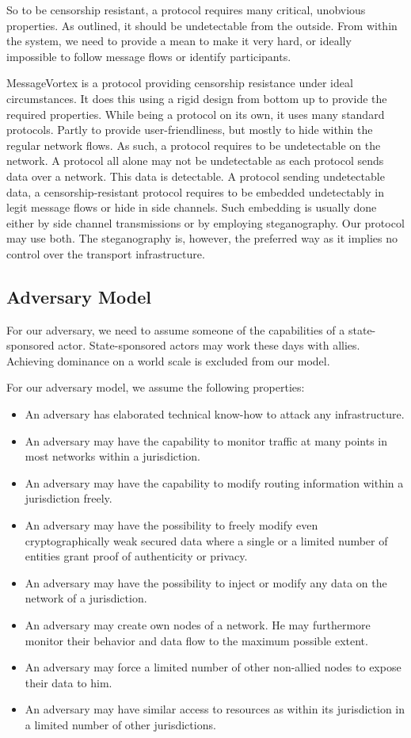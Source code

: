 \documentclass[10pt,journal,compsoc]{IEEEtran}
\begin{document}
So to be censorship resistant, a protocol requires many critical, unobvious properties. As outlined, it should be undetectable from the outside. From within the system, we need to provide a mean to make it very hard, or ideally impossible to follow message flows or identify participants.

MessageVortex is a protocol providing censorship resistance under ideal circumstances. It does this using a rigid design from bottom up to provide the required properties. While being a protocol on its own, it uses many standard protocols. Partly to provide user-friendliness, but mostly to hide within the regular network flows. As such, a protocol requires to be undetectable on the network. A protocol all alone may not be undetectable as each protocol sends data over a network. This data is detectable. A protocol sending undetectable data, a censorship-resistant protocol requires to be embedded undetectably in legit message flows or hide in side channels. Such embedding is usually done either by side channel transmissions or by employing steganography. Our protocol may use both. The steganography is, however, the preferred way as it implies no control over the transport infrastructure.

\subsection{Adversary Model}
For our adversary, we need to assume someone of the capabilities of a state-sponsored actor. State-sponsored actors may work these days with allies. Achieving dominance on a world scale is excluded from our model.

For our adversary model, we assume the following properties:
\begin{itemize}
	\item An adversary has elaborated technical know-how to attack any infrastructure.
	\item An adversary may have the capability to monitor traffic at many points in most networks within a jurisdiction.
	\item An adversary may have the capability to modify routing information within a jurisdiction freely.
	\item An adversary may have the possibility to freely modify even cryptographically weak secured data where a single or a limited number of entities grant proof of authenticity or privacy.
	\item An adversary may have the possibility to inject or modify any data on the network of a jurisdiction.
	\item An adversary may create own nodes of a network. He may furthermore monitor their behavior and data flow to the maximum possible extent.
	\item An adversary may force a limited number of other non-allied nodes to expose their data to him.
	\item An adversary may have similar access to resources as within its jurisdiction in a limited number of other jurisdictions.
\end{itemize}
\end{document}
